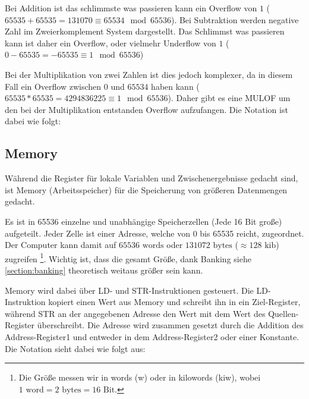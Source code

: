 \documentclass{scrartcl}
\begin{document}
Bei Addition ist das schlimmste was passieren kann ein Overflow von $1$ ($65535 + 65535 = 131070 \equiv 65534 \mod 65536$). Bei Subtraktion werden negative Zahl im Zweierkomplement System dargestellt. Das Schlimmst was passieren kann ist daher ein Overflow, oder vielmehr Underflow von $1$ ($0 - 65535 = -65535 \equiv 1 \mod 65536$)

Bei der Multiplikation von zwei Zahlen ist dies jedoch komplexer, da in diesem Fall ein Overflow zwischen $0$ und $65534$ haben kann ($65535 * 65535 = 4294836225 \equiv 1 \mod 65536$). Daher gibt es eine MULOF um den bei der Multiplikation entstanden Overflow aufzufangen. Die Notation ist dabei wie folgt:





\subsection{\label{section:memory}Memory}

Während die Register für lokale Variablen und Zwischenergebnisse gedacht sind, ist Memory (Arbeitsspeicher) für die Speicherung von größeren Datenmengen gedacht.

Es ist in 65536 einzelne und unabhängige Speicherzellen (Jede 16 Bit große) aufgeteilt.
Jeder Zelle ist einer Adresse, welche von 0 bis 65535 reicht, zugeordnet.
Der Computer kann damit auf $65536 \text{ words}$ oder $131072 \text{ bytes}$ ($\approx 128 \text{ kib}$) zugreifen
\footnote{Die Größe messen wir in words (w) oder in kilowords (kiw), wobei $1 \text{ word} = 2 \text{ bytes} = 16 \text{ Bit}$.}.
Wichtig ist, dass die gesamt Größe, dank Banking siehe \autoref{section:banking} theoretisch weitaus größer sein kann.

Memory wird dabei über LD- und STR-Instruktionen gesteuert.
Die LD-Instruktion kopiert einen Wert aus Memory und schreibt ihn in ein Ziel-Register, während STR an der angegebenen Adresse den Wert mit dem Wert des Quellen-Register überschreibt.
Die Adresse wird zusammen gesetzt durch die Addition des Address-Register1 und entweder in dem Address-Register2 oder einer Konstante.
Die Notation sieht dabei wie folgt aus:



\end{document}

